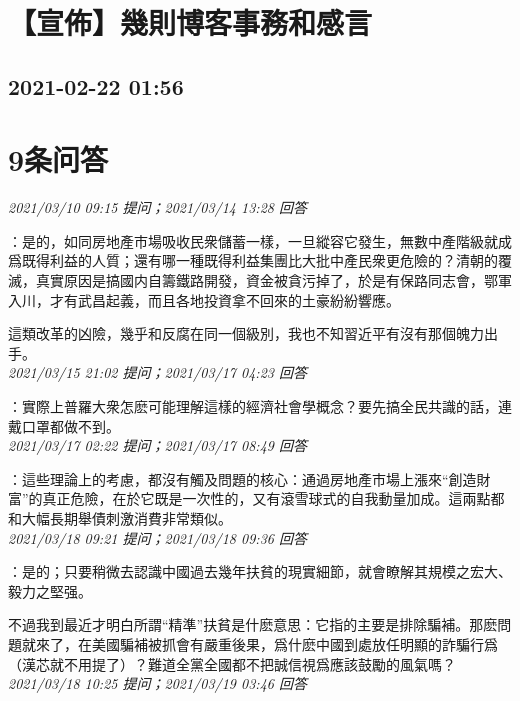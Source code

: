 \documentclass[twocolumn]{ctexart}
\begin{document}
\section{【宣佈】幾則博客事務和感言}
\subsection{2021-02-22 01:56}


\section{9条问答}

\textit{\hfill\noindent\small 2021/03/10 09:15 提问；2021/03/14 13:28 回答}

：是的，如同房地產市場吸收民衆儲蓄一樣，一旦縱容它發生，無數中產階級就成爲既得利益的人質；還有哪一種既得利益集團比大批中產民衆更危險的？清朝的覆滅，真實原因是搞國内自籌鐵路開發，資金被貪污掉了，於是有保路同志會，鄂軍入川，才有武昌起義，而且各地投資拿不回來的土豪紛紛響應。

這類改革的凶險，幾乎和反腐在同一個級別，我也不知習近平有沒有那個魄力出手。
\\

\textit{\hfill\noindent\small 2021/03/15 21:02 提问；2021/03/17 04:23 回答}

：實際上普羅大衆怎麽可能理解這樣的經濟社會學概念？要先搞全民共識的話，連戴口罩都做不到。
\\

\textit{\hfill\noindent\small 2021/03/17 02:22 提问；2021/03/17 08:49 回答}

：這些理論上的考慮，都沒有觸及問題的核心：通過房地產市場上漲來“創造財富”的真正危險，在於它既是一次性的，又有滾雪球式的自我動量加成。這兩點都和大幅長期舉債刺激消費非常類似。
\\

\textit{\hfill\noindent\small 2021/03/18 09:21 提问；2021/03/18 09:36 回答}

：是的；只要稍微去認識中國過去幾年扶貧的現實細節，就會瞭解其規模之宏大、毅力之堅强。

不過我到最近才明白所謂“精準”扶貧是什麽意思：它指的主要是排除騙補。那麽問題就來了，在美國騙補被抓會有嚴重後果，爲什麽中國到處放任明顯的詐騙行爲（漢芯就不用提了）？難道全黨全國都不把誠信視爲應該鼓勵的風氣嗎？
\\

\textit{\hfill\noindent\small 2021/03/18 10:25 提问；2021/03/19 03:46 回答}
\end{document}

